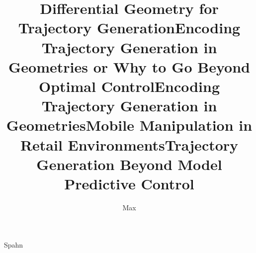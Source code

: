 \author{Max}{Spahn}

\title[Reactive Trajectory Encodings for Mobile Manipulators]{Differential Geometry for Trajectory Generation}
\title[]{Encoding Trajectory Generation in Geometries or Why to Go Beyond Optimal
Control}
\title[How can Robots Follow Paths?]{Encoding Trajectory Generation in Geometries}
\title[Reactive Trajectory Generation for High-Dimensional Robots]{Mobile Manipulation in Retail Environments}
\title[Behavior Encoding for Mobile Manipulation through Differential Geometry]{Trajectory Generation Beyond Model Predictive Control}

\newcommand\promotor{prof.\ dr.\ M.\ Wisse}
\newcommand\copromotor{dr.\ J.\ Alonso-Mora}


